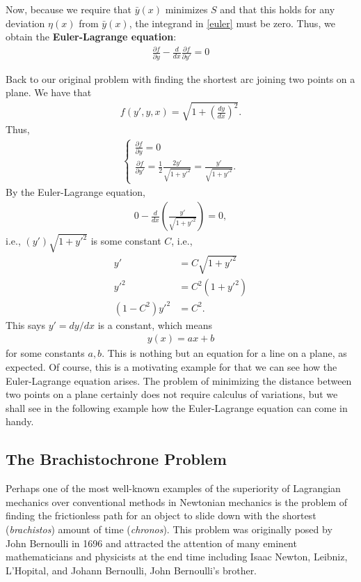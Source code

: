 \documentclass{article}
\newcommand{\p}{\partial}
\newcommand{\f}[2]{\frac{#1}{#2}}
\newcommand{\lp}{\left(}
\newcommand{\rp}{\right)}
\begin{document}
Now, because we require that $\bar{y}(x)$ minimizes $S$ and that this holds for any deviation $\eta(x)$ from $\bar{y}(x)$, the integrand in \eqref{euler} must be zero. Thus, we obtain the \textbf{Euler-Lagrange equation}:
\begin{align}
\boxed{\f{\p f}{\p y} - \f{d}{dx}\f{\p f}{\p y'} = 0}
\end{align}

Back to our original problem with finding the shortest arc joining two points on a plane. We have that
\begin{align}
f(y',y,x) = \sqrt{1 + \lp\f{dy}{dx}\rp^2}.
\end{align}
Thus,
\begin{align}
\begin{cases}
\f{\p f}{\p y} = 0\\
\f{\p f}{\p y'} = \f{1}{2}\f{2y'}{\sqrt{1 + y'^2}} = \f{y'}{\sqrt{1 + y'^2}}.
\end{cases}
\end{align}
By the Euler-Lagrange equation, 
\begin{align}
0 - \f{d}{dx}\lp \f{y'}{\sqrt{1 + y'^2}} \rp = 0,
\end{align}
i.e., $(y')\sqrt{1 + y'^2}$ is some constant $C$, i.e.,
\begin{align}
y' &= C\sqrt{1 + y'^2}\nonumber\\
y'^2 &= C^2(1+y'^2)\nonumber\\
(1 - C^2)y'^2 &= C^2.
\end{align} 
This says $y' = dy/dx$ is a constant, which means 
\begin{align}
y(x) = ax + b
\end{align} 
for some constants $a,b$. This is nothing but an equation for a line on a plane, as expected. Of course, this is a motivating example for that we can see how the Euler-Lagrange equation arises. The problem of minimizing the distance between two points on a plane certainly does not require calculus of variations, but we shall see in the following example how the Euler-Lagrange equation can come in handy.

\subsection{The Brachistochrone Problem}

Perhaps one of the most well-known examples of the superiority of Lagrangian mechanics over conventional methods in Newtonian mechanics is the problem of finding the frictionless path for an object to slide down with the shortest (\textit{brachistos}) amount of time (\textit{chronos}). This problem was originally posed by John Bernoulli in 1696 and attracted the attention of many eminent mathematicians and physicists at the end time including Isaac Newton, Leibniz, L'Hopital, and Johann Bernoulli, John Bernoulli's brother. \\
\end{document}
